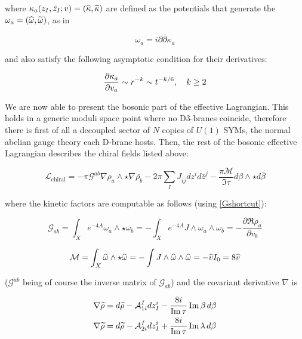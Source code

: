 where $\kappa_a(z_I,\bar z_I; v) = (\widehat{\kappa},\widetilde{\kappa})$ are defined as the potentials that generate the $\omega_a = (\widehat{\omega}, \widetilde{\omega})$, as in

\begin{equation}
	\omega_a = i \partial\bar \partial \kappa_a
	\label{}
\end{equation}

and also satisfy the following asymptotic condition for their derivatives:

\begin{equation}
	\frac{\partial\kappa_a}{\partial v_a} \sim r^{-k} \sim t^{-k/6}, \quad k \geq 2
	\label{potentialcondition}
\end{equation}


We are now able to present the bosonic part of the effective Lagrangian. This holds in a generic moduli space point where no D3-branes coincide, therefore there is first of all a decoupled sector of $N$ copies of $U(1)$ SYMs, the normal abelian gauge theory each D-brane hosts. Then, the rest of the bosonic effective Lagrangian describes the chiral fields listed above:

\begin{equation}
	\mathcal{L}_\mathrm{chiral} = - \pi \mathcal{G}^{ab} \nabla \rho_a \wedge \star \nabla \bar {\rho_b} - 2 \pi \sum_I J_{i\bar j} dz^i d\bar{z}^{\bar j} - \frac{\pi\mathcal{M}}{\Im \tau} d\beta \wedge \star d\bar\beta
	\label{y20lagrangian}
\end{equation}

where the kinetic factors are computable as follows (using \eqref{Gshortcut}):

\begin{equation}
	\mathcal{G}_{ab} = \int_X e^{-4A} \omega_a \wedge \star \omega_b = - \int_X e^{-4A} J \wedge \omega_a \wedge \omega_b = - \frac{\partial \Re \rho_a}{\partial v_b}
	\label{}
\end{equation}

\begin{equation}
	\mathcal{M} = \int_X \widehat{\omega} \wedge \star \widehat{\omega} = - \int J \wedge \widehat{\omega} \wedge \widehat{\omega} = - \widehat{v} I_0 = 8 \widehat{v}
	\label{Mfinal}
\end{equation}

($\mathcal G^{ab}$ being of course the inverse matrix of $\mathcal G_{ab}$) and the covariant derivative $\nabla$ is

\begin{align}
	\nabla \widehat{\rho} &= d \widehat{\rho} - \mathcal{A}_{1i}^{I} dz_I^i - \frac{8i}{\operatorname{Im} \tau} \operatorname{Im} \beta \, d\beta\\
	\nabla \widetilde{\rho} &= d \widetilde{\rho} - \mathcal{A}_{2i}^{I} dz_I^i + \frac{8i}{\operatorname{Im} \tau} \operatorname{Im} \lambda \, d\beta
	\label{}
\end{align}

